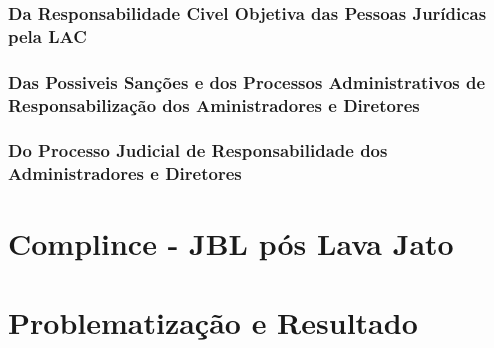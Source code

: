 \subsection{Da Responsabilidade Civel Objetiva das Pessoas Jurídicas pela LAC}



\subsection{Das Possiveis Sanções e dos Processos Administrativos de Responsabilização dos Aministradores e Diretores}



\subsection{Do Processo Judicial de Responsabilidade dos Administradores e Diretores}



\chapter{Complince - JBL pós Lava Jato }



\chapter{Problematização e Resultado}



